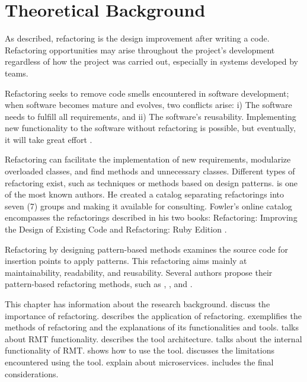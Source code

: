 \chapter{Theoretical Background}
\label{cap-background}

As \textcite{fowler2018refactoring} described, refactoring is the design improvement after writing a code. Refactoring opportunities may arise throughout the project's development regardless of how the project was carried out, especially in systems developed by teams.

Refactoring seeks to remove code smells encountered in software development; when software becomes mature and evolves, two conflicts arise: i) The software needs to fulfill all requirements, and ii) The software's reusability. Implementing new functionality to the software without refactoring is possible, but eventually, it will take great effort \cite{Gamma2009}.

Refactoring can facilitate the implementation of new requirements, modularize overloaded classes, and find methods and unnecessary classes. Different types of refactoring exist, such as techniques or methods based on design patterns. \textcite{fowler2018refactoring} is one of the most known authors. He created a catalog separating refactorings into seven (7) groups and making it available for consulting. Fowler's online catalog encompasses the refactorings described in his two books: Refactoring: Improving the Design of Existing Code \cite{fowler2018refactoring} and Refactoring: Ruby Edition \cite{fields2009refactoring}. 

Refactoring by designing pattern-based methods examines the source code for insertion points to apply patterns. This refactoring aims mainly at maintainability, readability, and reusability. Several authors propose their pattern-based refactoring methods, such as \textcite{cinneide2000automated}, \textcite{Gamma2009}, and \textcite{ouni2017more}.

This chapter has information about the research background.  discuss the importance of refactoring.  describes the application of refactoring.  exemplifies the methods of refactoring and the explanations of its functionalities and tools.  talks about RMT functionality.  describes the tool architecture.  talks about the internal functionality of RMT.  shows how to use the tool.  discusses the limitations encountered using the tool.  explain about microservices.  includes the final considerations.

